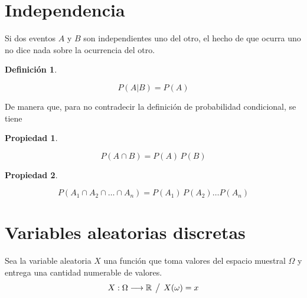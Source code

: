 \documentclass[a5paper,12pt,twoside]{book}
\newtheorem{defn}{{Definición}}[chapter]
\newtheorem{prop}{{Propiedad}}[chapter]
\begin{document}
\section{Independencia}

Si dos eventos $A$ y $B$ son independientes uno del otro, el hecho de que ocurra uno no dice nada sobre la ocurrencia del otro.

\begin{mdframed}[style=MyFrame1]
    \begin{defn}
    \end{defn}
    \begin{equation*}
        P(A|B) = P(A)
    \end{equation*}
\end{mdframed}

De manera que, para no contradecir la definición de probabilidad condicional, se tiene

\begin{mdframed}[style=MyFrame1]
    \begin{prop}
    \end{prop}
    \begin{equation*}
        P(A \cap B) = P(A) \, P(B)
    \end{equation*}
\end{mdframed}

\begin{mdframed}[style=MyFrame1]
    \begin{prop}
    \end{prop}
    \begin{equation*}
        P(A_1 \cap A_2 \cap \dots \cap A_n) = P(A_1) \, P(A_2) \dots P(A_n)
    \end{equation*}
\end{mdframed}


\section{Variables aleatorias discretas}

Sea la variable aleatoria $X$ una función que toma valores del espacio muestral $\Omega$ y entrega una cantidad numerable de valores.
\begin{equation*}
    X: \Omega \longrightarrow \mathbb{R} \hspace{1ex} \big/ \hspace{1ex} X(\omega) = x
\end{equation*}
\end{document}
